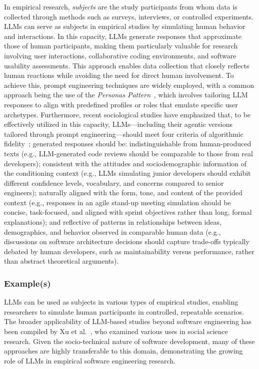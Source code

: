 In empirical research, \emph{subjects} are the study participants from whom data is collected through methods such as surveys, interviews, or controlled experiments.
LLMs can serve as subjects in empirical studies by simulating human behavior and interactions. In this capacity, LLMs generate responses that approximate those of human participants, making them particularly valuable for research involving user interactions, collaborative coding environments, and software usability assessments. This approach enables data collection that closely reflects human reactions while avoiding the need for direct human involvement.
To achieve this, prompt engineering techniques are widely employed, with a common approach being the use of the \textit{Personas Pattern}~\cite{DBLP:journals/corr/abs-2308-07702}, which involves tailoring LLM responses to align with predefined profiles or roles that emulate specific user archetypes. 
Furthermore, recent sociological studies have emphasized that, to be effectively utilized in this capacity, LLMs—including their agentic versions tailored through prompt engineering—should meet four criteria of algorithmic fidelity~\cite{DBLP:journals/corr/abs-2209-06899}; generated responses should be: indistinguishable from human-produced texts (e.g., LLM-generated code reviews should be comparable to those from real developers); consistent with the attitudes and sociodemographic information of the conditioning context (e.g., LLMs simulating junior developers should exhibit different confidence levels, vocabulary, and concerns compared to senior engineers); naturally aligned with the form, tone, and content of the provided context (e.g., responses in an agile stand-up meeting simulation should be concise, task-focused, and aligned with sprint objectives rather than long, formal explanations); and reflective of patterns in relationships between ideas, demographics, and behavior observed in comparable human data (e.g., discussions on software architecture decisions should capture trade-offs typically debated by human developers, such as maintainability versus performance, rather than abstract theoretical arguments).

\subsubsection{Example(s)}

LLMs can be used as subjects in various types of empirical studies, enabling researchers to simulate human participants in controlled, repeatable scenarios. The broader applicability of LLM-based studies beyond software engineering has been compiled by Xu et al.~\cite{DBLP:journals/ipm/XuSRGPLSH24}, who examined various uses in social science research. Given the socio-technical nature of software development, many of these approaches are highly transferable to this domain, demonstrating the growing role of LLMs in empirical software engineering research.

